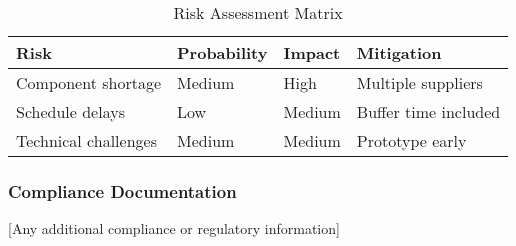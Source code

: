 \documentclass[final]{../designreport}
\begin{document}
\begin{table}[htbp]
\centering
\caption{Risk Assessment Matrix}
\begin{tabular}{@{}llll@{}}
\toprule
Risk & Probability & Impact & Mitigation \\
\midrule
Component shortage & Medium & High & Multiple suppliers \\
Schedule delays & Low & Medium & Buffer time included \\
Technical challenges & Medium & Medium & Prototype early \\
\bottomrule
\end{tabular}
\end{table}

\subsubsection{Compliance Documentation}
[Any additional compliance or regulatory information]
\end{document}
